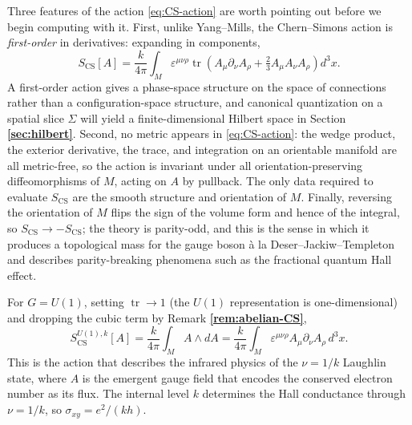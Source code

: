 \documentclass[11pt]{article}
\newcommand{\tr}{\operatorname{tr}}
\newcommand{\CS}{\operatorname{CS}}
\theoremstyle{definition}
\numberwithin{theorem}{section}
\numberwithin{equation}{section}
\let\del\partial
\begin{document}
\noindent Three features of the action \eqref{eq:CS-action} are worth pointing out before we begin computing with it. First, unlike Yang--Mills, the Chern--Simons action is \emph{first-order} in derivatives: expanding in components,
\begin{equation}\label{eq:CS-components}
S_{\CS}[A] = \frac{k}{4\pi}\int_M \varepsilon^{\mu\nu\rho}\tr\left(A_\mu \del_\nu A_\rho + \tfrac{2}{3}A_\mu A_\nu A_\rho\right)d^3 x.
\end{equation}
A first-order action gives a phase-space structure on the space of connections rather than a configuration-space structure, and canonical quantization on a spatial slice $\Sigma$ will yield a finite-dimensional Hilbert space in Section \textbf{\ref{sec:hilbert}}. Second, no metric appears in \eqref{eq:CS-action}: the wedge product, the exterior derivative, the trace, and integration on an orientable manifold are all metric-free, so the action is invariant under all orientation-preserving diffeomorphisms of $M$, acting on $A$ by pullback. The only data required to evaluate $S_{\CS}$ are the smooth structure and orientation of $M$. Finally, reversing the orientation of $M$ flips the sign of the volume form and hence of the integral, so $S_{\CS}\to -S_{\CS}$; the theory is parity-odd, and this is the sense in which it produces a topological mass for the gauge boson \`a la Deser--Jackiw--Templeton \cite{DeserJackiwTempleton1982} and describes parity-breaking phenomena such as the fractional quantum Hall effect.

\begin{example}\label{ex:U1-action}
For $G = U(1)$, setting $\tr \to 1$ (the $U(1)$ representation is one-dimensional) and dropping the cubic term by Remark \textbf{\ref{rem:abelian-CS}},
\begin{equation}\label{eq:U1-action}
S_{\CS}^{U(1),k}[A] = \frac{k}{4\pi}\int_M A\wedge dA = \frac{k}{4\pi}\int_M \varepsilon^{\mu\nu\rho}A_\mu \del_\nu A_\rho\, d^3 x.
\end{equation}
This is the action that describes the infrared physics of the $\nu = 1/k$ Laughlin state, where $A$ is the emergent gauge field that encodes the conserved electron number as its flux. The internal level $k$ determines the Hall conductance through $\nu = 1/k$, so $\sigma_{xy} = e^2/(kh)$.
\end{example}
\end{document}
